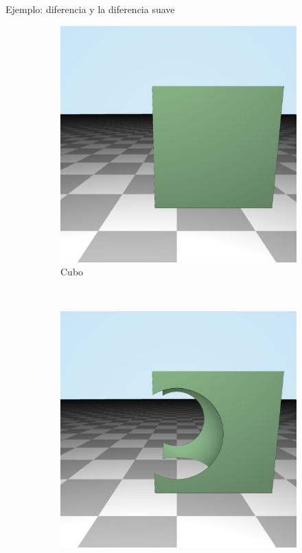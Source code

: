 \begin{frame}[fragile]{Ejemplo: diferencia y la diferencia suave}
\begin{figure}[htp]
\begin{subfigure}[b]{0.2\textwidth}
   \includegraphics[width=\textwidth]{img/leftBox}
   \caption{Cubo}
 \end{subfigure}
~
 \begin{subfigure}[b]{0.2\textwidth}
   \includegraphics[width=\textwidth]{img/Substraction}

\end{subfigure}
\end{figure}
\end{frame}
